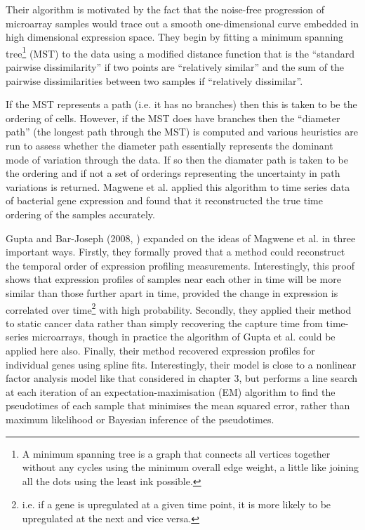 Their algorithm is motivated by the fact that the noise-free progression of microarray samples would trace out a smooth one-dimensional curve embedded in high dimensional expression space. They begin by fitting a minimum spanning tree\footnote{
A minimum spanning tree is a graph that connects all vertices together without any cycles using the minimum overall edge weight, a little like joining all the dots using the least ink possible.
} (MST) to the data using a modified distance function that is the ``standard pairwise dissimilarity'' if two points are ``relatively similar'' and the sum of the pairwise dissimilarities between two samples if ``relatively dissimilar''.

If the MST represents a path (i.e. it has no branches) then this is taken to be the ordering of cells. However, if the MST does have branches then the ``diameter path'' (the longest path through the MST) is computed and various heuristics are run to assess whether the diameter path essentially represents the dominant mode of variation through the data. If so then the diamater path is taken to be the ordering and if not a set of orderings representing the uncertainty in path variations is returned. Magwene et al. applied this algorithm to time series data of bacterial gene expression and found that it reconstructed the true time ordering of the samples accurately.

Gupta and Bar-Joseph (2008, \cite{Gupta2008-fd}) expanded on the ideas of Magwene et al. in three important ways. Firstly, they formally proved that a method could reconstruct the temporal order of expression profiling measurements. Interestingly, this proof shows that expression profiles of samples near each other in time will be more similar than those further apart in time, provided the change in expression is correlated over time\footnote{i.e. if a gene is upregulated at a given time point, it is more likely to be upregulated at the next and vice versa.} with high probability.
Secondly, they applied their method to static cancer data rather than simply recovering the capture time from time-series microarrays, though in practice the algorithm of Gupta et al. could be applied here also. Finally, their method recovered expression profiles for individual genes using spline fits. Interestingly, their model is close to a nonlinear factor analysis model like that considered in chapter 3, but performs a line search at each iteration of an expectation-maximisation (EM) algorithm to find the pseudotimes of each sample that minimises the mean squared error, rather than maximum likelihood or Bayesian inference of the pseudotimes.

